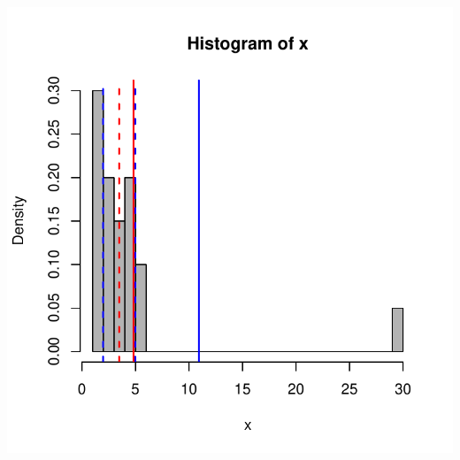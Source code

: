 \documentclass{beamer}\usepackage[]{graphicx}\usepackage[]{color}
\newenvironment{knitrout}{}{} %
\renewenvironment{knitrout}{\setlength{\topsep}{0mm}}{}
\begin{document}
\begin{frame}[fragile]
\begin{columns}[c]
\centering
\begin{knitrout}
\color{fgcolor}
\includegraphics[width=1.1\linewidth]{figure/unnamed-chunk-21-1} 

\end{knitrout}

\end{columns}

\end{frame} 
\end{document}

